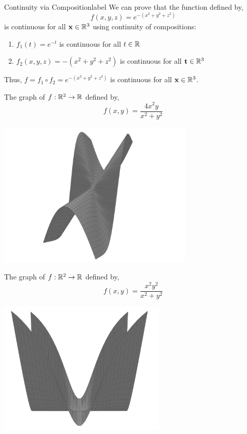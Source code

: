 \begin{ex}{Continuity via Composition}{label}
    We can prove that the function  defined by,
    \[f(x, y, z) = e^{-(x^2 + y^2 + z^2)}\]
    is continuous for all $\mathbf{x} \in \mathbb{R}^3$ using continuity of compositions:
    \begin{enumerate}
        \item $f_1(t) = e^{-t}$ is continuous for all $t \in \mathbb{R}$
        \item $f_2(x, y, z) = -(x^2 + y^2 + z^2)$ is continuous for all $\mathbf{t} \in \mathbb{R}^3$
    \end{enumerate}
    Thus, $f = f_1 \circ f_2 = e^{-(x^2 + y^2 + z^2)}$ is continuous for all $\mathbf{x} \in \mathbb{R}^3$.
\end{ex}

\begin{marginfigure}
    The graph of $f: \mathbb{R}^2 \rightarrow \mathbb{R}$ defined by,
    \[f(x, y) = \frac{4x^2y}{x^2 + y^2}\]
    \begin{center}
       \includegraphics[width=0.7\textwidth]{figures/wk-1/fig-22.png}
    \end{center}
    
    \LineBreak

    The graph of $f: \mathbb{R}^2 \rightarrow \mathbb{R}$ defined by,
    \[f(x, y) = \frac{x^2y^2}{x^2 + y^2}\]
    \begin{center}
        \includegraphics[width=0.6\textwidth]{figures/wk-1/fig-23.png}
    \end{center}
    
\end{marginfigure}

